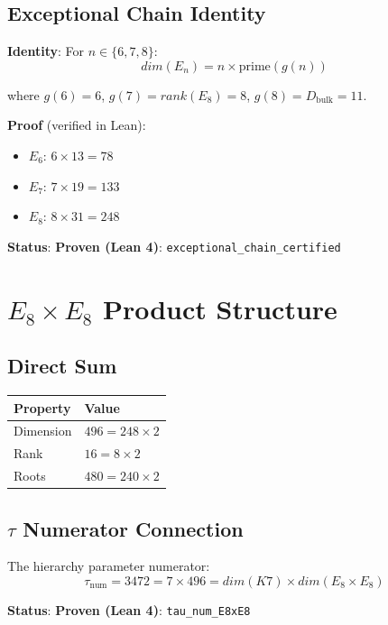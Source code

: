 \documentclass[11pt,a4paper]{article}
\newcommand{\E}{\mathrm{E}}
\newcommand{\Kseven}{K_7}
\newcommand{\dimE}{\mathrm{dim}}
\newcommand{\rk}{\mathrm{rank}}
\newcommand{\proven}{\textsc{Proven}}
\def\Kseven{K7}%
\def\E{E}%
\def\dimE{dim}%
\def\rk{rank}%
\def\proven{Proven}%
\begin{document}
\subsection{Exceptional Chain Identity}

\textbf{Identity}: For $n \in \{6, 7, 8\}$:
$$\dimE(\E_n) = n \times \text{prime}(g(n))$$

where $g(6) = 6$, $g(7) = \rk(\E_8) = 8$, $g(8) = D_{\text{bulk}} = 11$.

\textbf{Proof} (verified in Lean):
\begin{itemize}
\item $\E_6$: $6 \times 13 = 78$ \checkmark
\item $\E_7$: $7 \times 19 = 133$ \checkmark
\item $\E_8$: $8 \times 31 = 248$ \checkmark
\end{itemize}

\textbf{Status}: \textbf{\proven{} (Lean 4)}: \texttt{exceptional\_chain\_certified}

\section{$\E_8\times\E_8$ Product Structure}

\subsection{Direct Sum}

\begin{table}[H]
\centering
\begin{tabular}{ll}
\toprule
Property & Value \\
\midrule
Dimension & $496 = 248 \times 2$ \\
Rank & $16 = 8 \times 2$ \\
Roots & $480 = 240 \times 2$ \\
\bottomrule
\end{tabular}
\end{table}

\subsection{$\tau$ Numerator Connection}

The hierarchy parameter numerator:
$$\tau_{\text{num}} = 3472 = 7 \times 496 = \dimE(\Kseven) \times \dimE(\E_8 \times \E_8)$$

\textbf{Status}: \textbf{\proven{} (Lean 4)}: \texttt{tau\_num\_E8xE8}
\end{document}
